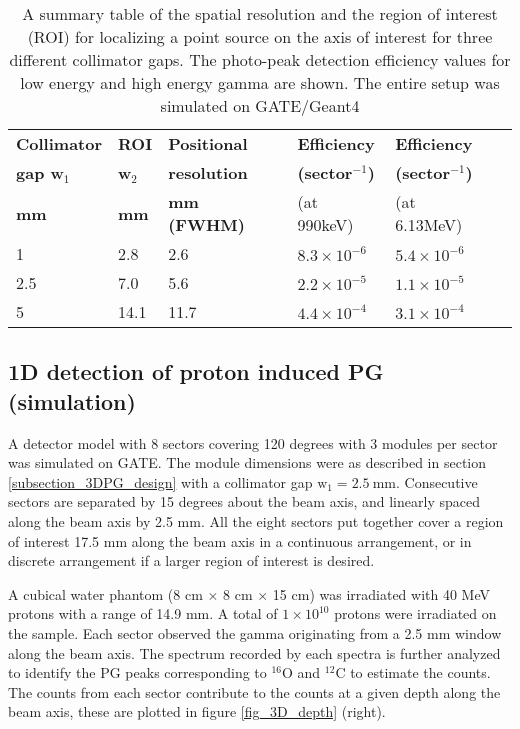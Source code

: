 \documentclass[11pt,a4paper]{article}
\begin{document}
\begin{table}[]
\begin{center}
\caption{A summary table of the spatial resolution and the region of interest (ROI) for localizing a point source on the axis of interest for three different collimator gaps. The photo-peak detection efficiency values for low energy and high energy gamma are shown. The entire setup was simulated on GATE/Geant4} \label{table_3D_detectionefficiency}
\begin{tabular}{llllll} 
\hline
{\bf Collimator  }  & {\bf ROI} & {\bf Positional } & {\bf Efficiency} & {\bf Efficiency} \\
{\bf gap w$_1$}  & {\bf  w$_2$ } & {\bf resolution} &  {\bf (sector$^{-1}$)}  &  {\bf (sector$^{-1}$)}  \\
{\bf mm}  & {\bf mm} & {\bf mm (FWHM)} & (at 990keV)  & (at 6.13MeV)    \\
\hline
1 & 2.8 & 2.6  &   $\mathrm{8.3\times 10^{-6}}$  &   $\mathrm{5.4\times 10^{-6}}$ \\
2.5 & 7.0 & 5.6  &   $\mathrm{2.2\times 10^{-5}}$  &   $\mathrm{1.1\times 10^{-5}}$ \\
5 & 14.1 & 11.7  &   $\mathrm{4.4\times 10^{-4}}$   &   $\mathrm{3.1\times 10^{-4}}$\\
\hline
\end {tabular}
\end {center}
\end {table}
\normalsize


\subsection{1D detection of proton induced PG (simulation)}
A detector model with 8 sectors covering 120 degrees with 3 modules per sector was simulated on GATE. The module dimensions were as described in section \ref{subsection_3DPG_design} with a collimator gap $\mathrm{w_1=2.5\ mm}$. Consecutive sectors are separated by 15 degrees about the beam axis, and linearly spaced along the beam axis by 2.5 mm. All the eight sectors put together cover a region of interest 17.5 mm along the beam axis in a continuous arrangement, or  in discrete arrangement if a larger region of interest is desired. 

A cubical water phantom (8 cm $\times$ 8 cm $\times$ 15 cm) was irradiated with 40 MeV protons with a range of 14.9 mm. A total of $\mathrm{1\times 10^{10}}$ protons were irradiated on the sample. Each sector observed the gamma originating from a 2.5 mm window along the beam axis. The spectrum recorded by each spectra is further analyzed to identify the PG peaks corresponding to $\mathrm{^{16}O}$ and $\mathrm{^{12}C}$ to estimate the counts. The counts from each sector contribute to the counts at a given depth along the beam axis, these are plotted in figure \ref{fig_3D_depth} (right). 
\end{document}
